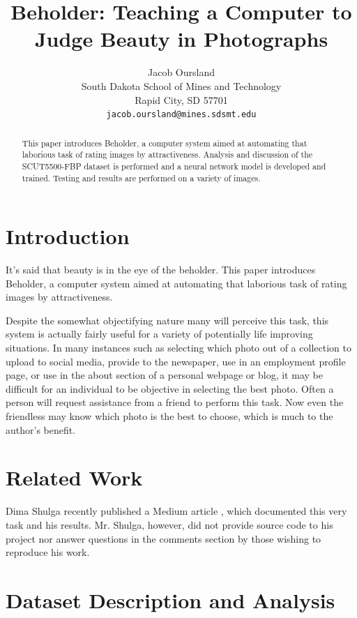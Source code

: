 \documentclass{article}
\title{Beholder: Teaching a Computer to \\Judge Beauty in Photographs}
\author{
  Jacob Oursland\\
  South Dakota School of Mines and Technology\\
  Rapid City, SD 57701\\
  \texttt{jacob.oursland@mines.sdsmt.edu} \\
}
\begin{document}

\maketitle

\begin{abstract}
This paper introduces Beholder, a computer system aimed at automating that laborious task of rating images by attractiveness.  Analysis and discussion of the SCUT5500-FBP dataset is performed and a neural network model is developed and trained.  Testing and results are performed on a variety of images.
\end{abstract}

\section{Introduction}

It's said that beauty is in the eye of the beholder.  This paper introduces Beholder, a computer system aimed at automating that laborious task of rating images by attractiveness.

Despite the somewhat objectifying nature many will perceive this task, this system is actually fairly useful for a variety of potentially life improving situations.  In many instances such as selecting which photo out of a collection to upload to social media, provide to the newspaper, use in an employment profile page, or use in the about section of a personal webpage or blog, it may be difficult for an individual to be objective in selecting the best photo.  Often a person will request assistance from a friend to perform this task.  Now even the friendless may know which photo is the best to choose, which is much to the author's benefit.

\section{Related Work}

Dima Shulga recently published a Medium article \citep{shulga-medium}, which documented this very task and his results.  Mr. Shulga, however, did not provide source code to his project nor answer questions in the comments section by those wishing to reproduce his work.

\section{Dataset Description and Analysis}
\end{document}
